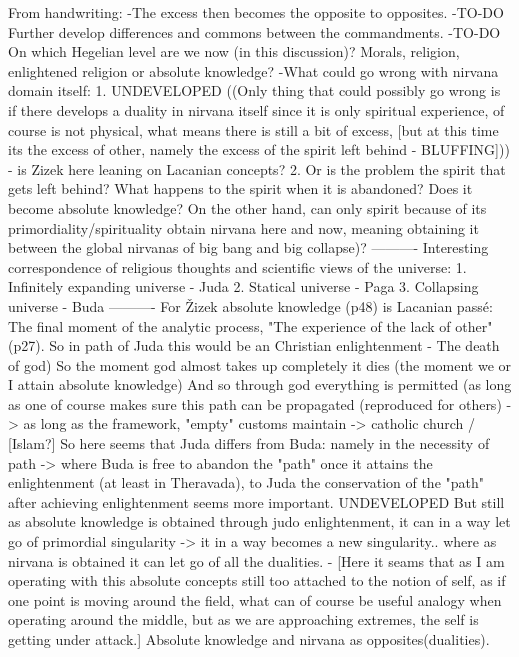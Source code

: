 \documentclass[10pt]{book}
\begin{document}
From handwriting:
-The excess then becomes the opposite to opposites.
-TO-DO Further develop differences and commons between the commandments.
-TO-DO On which Hegelian level are we now (in this discussion)? Morals, religion, enlightened religion or absolute knowledge? 
-What could go wrong with nirvana domain itself:
1. UNDEVELOPED ((Only thing that could possibly go wrong is if there develops a duality in nirvana itself since it is only spiritual experience, of course is not physical, what means there is still a bit of excess, [but at this time its the excess of other, namely the excess of the spirit left behind - BLUFFING])) - is Zizek here leaning on Lacanian concepts?
2. Or is the problem the spirit that gets left behind? What happens to the spirit when it is abandoned? Does it become absolute knowledge? On the other hand, can only spirit because of its primordiality/spirituality obtain nirvana here and now, meaning obtaining it between the global nirvanas of big bang and big collapse)?
----------
Interesting correspondence of religious thoughts and scientific views of the universe:
1. Infinitely expanding universe - Juda
2. Statical universe - Paga
3. Collapsing universe - Buda
----------
For \v Zizek absolute knowledge (p48) is Lacanian pass\'e: 
The final moment of the analytic process, "The experience of the lack of other" (p27). So in path of Juda this would be an Christian enlightenment - The death of god) So the moment god almost takes up completely it dies (the moment we or I attain absolute knowledge) And so through god everything is permitted (as long as one of course makes sure this path can be propagated (reproduced for others) -> as long as the framework, "empty" customs maintain -> catholic church / [Islam?]
So here seems that Juda differs from Buda: namely in the necessity of path -> where Buda is free to abandon the "path" once it attains the enlightenment (at least in Theravada), to Juda the conservation of the "path" after achieving enlightenment seems more important.
UNDEVELOPED But still as absolute knowledge is obtained through judo enlightenment, it can in a way let go of primordial singularity -> it in a way becomes a new singularity.. where as nirvana is obtained it can let go of all the dualities. - [Here it seams that as I am operating with this absolute concepts still too attached to the notion of self, as if one point is moving around the field, what can of course be useful analogy when operating around the middle, but as we are approaching extremes, the self is getting under attack.]
Absolute knowledge and nirvana as opposites(dualities).
\end{document}
